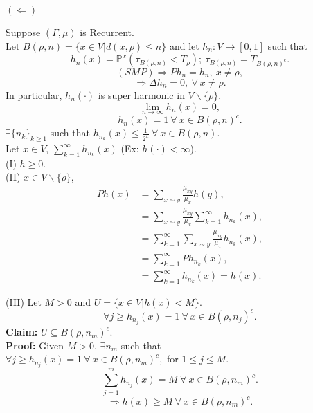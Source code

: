 \documentclass[main]{subfiles}
\begin{document}
$(\Leftarrow)$

Suppose $(\Gamma,\mu)$ is Recurrent. \\
Let $B(\rho,n)=\{x\in V| d(x,\rho)\leq n\}$ and let $h_n:V\rightarrow[0,1]$ such that
$$h_n(x)=\mathbb{P}^x({\tau}_{B(\rho,n)}<T_\rho);~{\tau}_{B(\rho,n)}=T_{B(\rho,n)^c}.$$
$$(SMP)\Rightarrow Ph_n=h_n,~x\neq \rho,$$
$$\Rightarrow \Delta h_n=0,~\forall~x\neq \rho.$$
In particular, $h_n(\cdot)$ is super harmonic in  $V\backslash{\{\rho\}}$.\\
$$\lim_{n\rightarrow\infty}h_n(x)=0,$$
$$h_n(x)=1~\forall~x\in B(\rho,n)^c.$$
$\exists \{n_k\}_{k\geq 1} $ such that $h_{n_k}(x)\leq \frac{1}{2^k}~\forall~x\in B(\rho,n).$\\
Let $x\in V$, $\sum\limits_{k=1}^{\infty}h_{n_k}(x)$ (Ex: $h(\cdot)<\infty$).\\
(I) $h\geq 0$.\\
(II) $x\in V\backslash{\{\rho\}}$,
\begin{align*}
    Ph(x) & =\sum_{x\sim y} \frac{\mu_{xy}}{\mu_x}h(y),                          \\
          & =\sum_{x\sim y} \frac{\mu_{xy}}{\mu_x}\sum_{k=1}^{\infty}h_{n_k}(x), \\
          & =\sum_{k=1}^{\infty}\sum_{x\sim y} \frac{\mu_{xy}}{\mu_x}h_{n_k}(x), \\
          & =\sum_{k=1}^{\infty}Ph_{n_k}(x),                                     \\
          & =\sum_{k=1}^{\infty}h_{n_k}(x)=h(x).
\end{align*}

(III) Let $M>0$ and $U=\{x\in V|h(x)<M\}$.
$$\forall j\geq h_{n_j}(x)=1~\forall~ x \in B(\rho,n_j)^c.$$
\textbf{Claim:} $U\subseteq B(\rho,n_m)^c$.\\
\textbf{Proof:} Given $M>0$, $\exists n_m$ such that\\
$\forall j\geq h_{n_j}(x)=1~\forall~ x \in B(\rho,n_m)^c,$ for $1\leq j\leq M$.\\
$$\sum_{j=1}^{m}h_{n_j}(x)=M~\forall ~x \in B(\rho,n_m)^c.$$
$$\Rightarrow h(x)\geq M ~\forall~ x \in B(\rho,n_m)^c.$$
\end{document}
